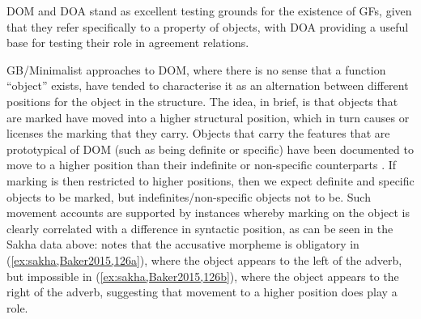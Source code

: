 \documentclass[output=paper
,modfonts
,nonflat]{langsci/langscibook}
\begin{document}
\noindent DOM and DOA stand as excellent testing grounds for the existence of GFs, given that they refer specifically to a property of objects, with DOA providing a useful base for testing their role in agreement relations.

GB/Minimalist approaches to DOM, where there is no sense that a function ``object'' exists, have tended to characterise it as an alternation between different positions for the object in the structure.
The idea, in brief, is that objects that are marked have moved into a higher structural position, which in turn causes or licenses the marking that they carry. Objects that carry the features that are prototypical of DOM (such as being definite or specific) have been documented to move to a higher position than their indefinite or non-specific counterparts \parencite{Diesing1992}.
If marking is then restricted to higher positions, then we expect definite and specific objects to be marked, but indefinites/non-specific objects not to be.
Such movement accounts are supported by instances whereby marking on the object is clearly correlated with a difference in syntactic position, as can be seen in the Sakha data above: \citeauthor{Baker2015} notes that the accusative morpheme is obligatory in
(\ref{ex:sakha,Baker2015,126a}), where the object appears to the left of the adverb, but impossible in (\ref{ex:sakha,Baker2015,126b}), where the object appears to the right of the adverb, suggesting that movement to a higher position does play a role.
\end{document}
